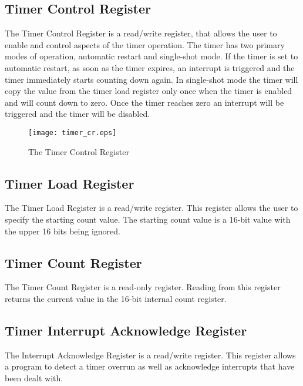 \subsection{Timer Control Register}

The Timer Control Register is a read/write register, that allows the
user to enable and control aspects of the timer operation. The timer
has two primary modes of operation, automatic restart and single-shot
mode. If the timer is set to automatic restart, as soon as the timer
expires, an interrupt is triggered and the timer immediately starts
counting down again. In single-shot mode the timer will copy the value
from the timer load register only once when the timer is enabled and
will count down to zero. Once the timer reaches zero an interrupt will
be triggered and the timer will be disabled.

\begin{figure}[h]
\begin{center}
\texttt{[image: timer\_cr.eps]}
\caption{The Timer Control Register}
\label{timer_cr_pic}
\end{center}
\end{figure}

\subsection{Timer Load Register}

The Timer Load Register is a read/write register. This register allows
the user to specify the starting count value. The starting count value
is a 16-bit value with the upper 16 bits being ignored.

\subsection{Timer Count Register}

The Timer Count Register is a read-only register. Reading from this
register returns the current value in the 16-bit internal count
register.

\subsection{Timer Interrupt Acknowledge Register}

The Interrupt Acknowledge Register is a read/write register. This
register allows a program to detect a timer overrun as well as
acknowledge interrupts that have been dealt with.

